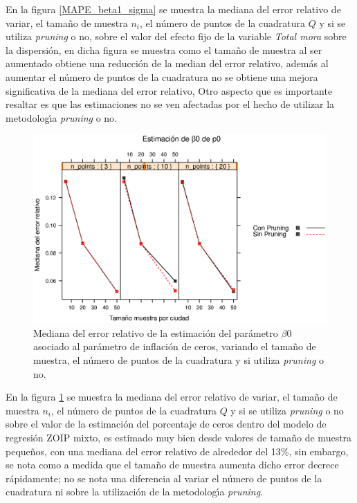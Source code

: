 En la figura \ref{MAPE_beta1_sigma} se muestra la mediana del error relativo de variar, el tama\~{n}o de muestra $n_i$, el n\'{u}mero de puntos de la cuadratura $Q$ y si se utiliza \textit{pruning} o no, sobre el valor del efecto fijo de la variable \textsl{Total mora} sobre la dispersi\'{o}n, en dicha figura se muestra como el tama\~{n}o de muestra al ser aumentado obtiene una reducci\'{o}n de la median del error relativo, adem\'{a}s al aumentar el n\'{u}mero de puntos de la cuadratura no se obtiene una mejora significativa de la mediana del error relativo, Otro aspecto que es importante resaltar es que las estimaciones no se ven afectadas por el hecho de utilizar la metodolog\'{\i}a \textit{pruning} o no.\\

\begin{figure}
	\begin{center}
		\includegraphics[scale=0.6]{MAPE_beta0_p0.eps}	
		\caption{Mediana del error relativo de la estimaci\'{o}n del par\'{a}metro $\beta0$ asociado al par\'{a}metro de inflaci\'{o}n de ceros, variando el tama\~{n}o de muestra, el n\'{u}mero de puntos de la cuadratura y si utiliza \textit{pruning} o no.}
		\label{MAPE_beta0_p0}
	\end{center}
\end{figure}

En la figura \ref{MAPE_beta0_p0} se muestra la mediana del error relativo de variar, el tama\~{n}o de muestra $n_i$, el n\'{u}mero de puntos de la cuadratura $Q$ y si se utiliza \textit{pruning} o no sobre el valor de la estimaci\'{o}n del porcentaje de ceros dentro del modelo de regresi\'{o}n ZOIP mixto, es estimado muy bien desde valores de tama\~{n}o de muestra peque\~{n}os, con una mediana del error relativo de alrededor del 13\%, sin embargo, se nota como a medida que el tama\~{n}o de muestra aumenta dicho error decrece r\'{a}pidamente; no se nota una diferencia al variar el n\'{u}mero de puntos de la cuadratura ni sobre la utilizaci\'{o}n de la metodolog\'{\i}a \textit{pruning}.\\

